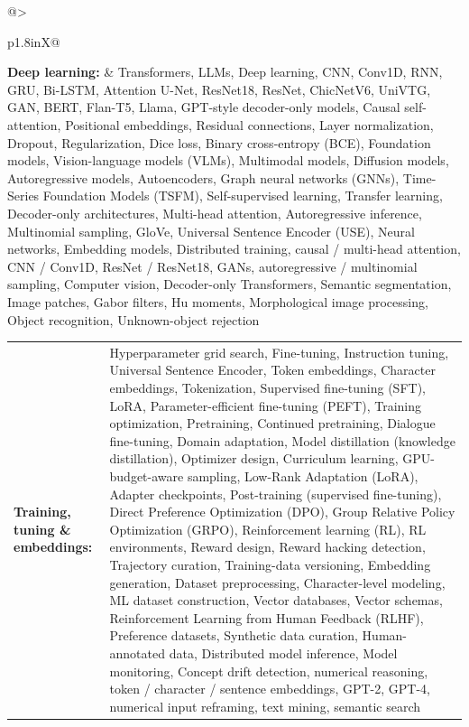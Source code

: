 \documentclass[letterpaper,11pt]{article}
\begin{document}
\begin{tabularx}{\linewidth}{@{}>{\raggedright\arraybackslash}p{1.8in}X@{}}
\textbf{Deep learning:} & \footnotesize{Transformers, LLMs, Deep learning, CNN, Conv1D, RNN, GRU, Bi-LSTM, Attention U-Net, ResNet18, ResNet, ChicNetV6, UniVTG, GAN, BERT, Flan-T5, Llama, GPT-style decoder-only models, Causal self-attention, Positional embeddings, Residual connections, Layer normalization, Dropout, Regularization, Dice loss, Binary cross-entropy (BCE), Foundation models, Vision-language models (VLMs), Multimodal models, Diffusion models, Autoregressive models, Autoencoders, Graph neural networks (GNNs), Time-Series Foundation Models (TSFM), Self-supervised learning, Transfer learning, Decoder-only architectures, Multi-head attention, Autoregressive inference, Multinomial sampling, GloVe, Universal Sentence Encoder (USE), Neural networks, Embedding models, Distributed training, causal / multi-head attention, CNN / Conv1D, ResNet / ResNet18, GANs, autoregressive / multinomial sampling, Computer vision, Decoder-only Transformers, Semantic segmentation, Image patches, Gabor filters, Hu moments, Morphological image processing, Object recognition, Unknown-object rejection}\\
\end{tabularx}
\par\vspace{2pt}
\begin{tabularx}{\linewidth}{@{}>{\raggedright\arraybackslash}p{1.8in}X@{}}
\textbf{Training, tuning \& embeddings:} & \footnotesize{Hyperparameter grid search, Fine-tuning, Instruction tuning, Universal Sentence Encoder, Token embeddings, Character embeddings, Tokenization, Supervised fine-tuning (SFT), LoRA, Parameter-efficient fine-tuning (PEFT), Training optimization, Pretraining, Continued pretraining, Dialogue fine-tuning, Domain adaptation, Model distillation (knowledge distillation), Optimizer design, Curriculum learning, GPU-budget-aware sampling, Low-Rank Adaptation (LoRA), Adapter checkpoints, Post-training (supervised fine-tuning), Direct Preference Optimization (DPO), Group Relative Policy Optimization (GRPO), Reinforcement learning (RL), RL environments, Reward design, Reward hacking detection, Trajectory curation, Training-data versioning, Embedding generation, Dataset preprocessing, Character-level modeling, ML dataset construction, Vector databases, Vector schemas, Reinforcement Learning from Human Feedback (RLHF), Preference datasets, Synthetic data curation, Human-annotated data, Distributed model inference, Model monitoring, Concept drift detection, numerical reasoning, token / character / sentence embeddings, GPT-2, GPT-4, numerical input reframing, text mining, semantic search}\\
\end{tabularx}
\end{document}
